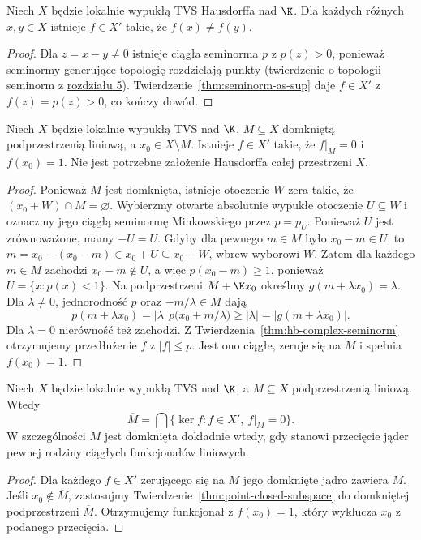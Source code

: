 \begin{wniosek}\label{cor:dual-separates}
Niech $X$ będzie lokalnie wypukłą TVS Hausdorffa
nad $\K$. Dla każdych różnych $x,y\in X$ istnieje
$f\in X'$ takie, że $f(x)\ne f(y)$.
\end{wniosek}
\begin{proof}
Dla $z=x-y\ne0$ istnieje ciągła seminorma $p$
z $p(z)>0$, ponieważ seminormy generujące topologię
rozdzielają punkty (twierdzenie o topologii seminorm z \hyperref[sec:lokalnie-wypukle]{rozdziału 5}).
Twierdzenie~\ref{thm:seminorm-as-sup} daje $f\in X'$
z $f(z)=p(z)>0$, co kończy dowód.
\end{proof}

\begin{twierdzenie}
\label{thm:point-closed-subspace}
Niech $X$ będzie lokalnie wypukłą TVS nad $\K$,
$M\subseteq X$ domkniętą podprzestrzenią liniową,
a $x_0\in X\setminus M$. Istnieje $f\in X'$
takie, że $f|_M=0$ i $f(x_0)=1$.
Nie jest potrzebne założenie Hausdorffa całej przestrzeni $X$.
\end{twierdzenie}
\begin{proof}
Ponieważ $M$ jest domknięta, istnieje otoczenie
$W$ zera takie, że $(x_0+W)\cap M=\varnothing$.
Wybierzmy otwarte absolutnie wypukłe otoczenie
$U\subseteq W$ i oznaczmy jego ciągłą seminormę
Minkowskiego przez $p=p_U$.
Ponieważ $U$ jest zrównoważone, mamy $-U=U$.
Gdyby dla pewnego $m\in M$ było $x_0-m\in U$,
to $m=x_0-(x_0-m)\in x_0+U\subseteq x_0+W$,
wbrew wyborowi $W$. Zatem dla każdego $m\in M$
zachodzi $x_0-m\notin U$, a więc $p(x_0-m)\ge1$,
ponieważ $U=\{x:p(x)<1\}$.
Na podprzestrzeni $M+\K x_0$ określmy
$g(m+\lambda x_0)=\lambda$. Dla $\lambda\ne0$,
jednorodność $p$ oraz $-m/\lambda\in M$ dają
\[
 p(m+\lambda x_0)=|\lambda|\,
 p\bigl(x_0+m/\lambda\bigr)\ge|\lambda|
 =|g(m+\lambda x_0)|.
\]
Dla $\lambda=0$ nierówność też zachodzi.
Z Twierdzenia~\ref{thm:hb-complex-seminorm} otrzymujemy
przedłużenie $f$ z $|f|\le p$. Jest ono ciągłe,
zeruje się na $M$ i spełnia $f(x_0)=1$.
\end{proof}

\begin{wniosek}
\label{cor:closed-as-annihilator}
Niech $X$ będzie lokalnie wypukłą TVS nad $\K$,
a $M\subseteq X$ podprzestrzenią liniową. Wtedy
\[
 \overline M=\bigcap\{\ker f:f\in X',\ f|_M=0\}.
\]
W szczególności $M$ jest domknięta dokładnie wtedy,
gdy stanowi przecięcie jąder pewnej rodziny ciągłych
funkcjonałów liniowych.
\end{wniosek}
\begin{proof}
Dla każdego $f\in X'$ zerującego się na $M$
jego domknięte jądro zawiera $\overline M$.
Jeśli $x_0\notin\overline M$, zastosujmy
Twierdzenie~\ref{thm:point-closed-subspace}
do domkniętej podprzestrzeni $\overline M$.
Otrzymujemy funkcjonał z $f(x_0)=1$, który
wyklucza $x_0$ z podanego przecięcia.
\end{proof}

